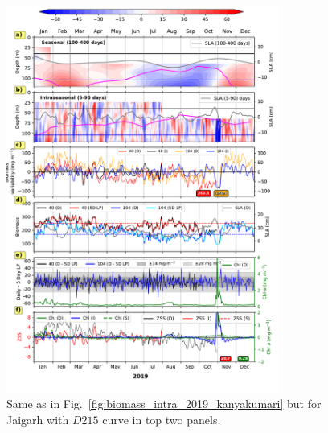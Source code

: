 \documentclass[12pt,a4paper]{article}
\begin{document}
\begin{figure}[htbp]
	\centering
	\includegraphics[width=0.8\textwidth]{./fig_s07_biomass_intra_2019_jaigarh.pdf} 
	\caption{Same as in Fig.~\ref{fig:biomass_intra_2019_kanyakumari} but for Jaigarh with $D215$ curve in top two panels.}		
	\label{fig:biomass_intra_2019_jaigarh}
\end{figure}
\end{document}
